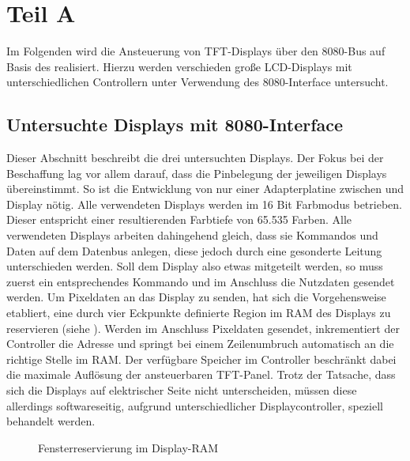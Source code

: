 \chapter{Teil A}
\label{cha:TeilA}
Im Folgenden wird die Ansteuerung von TFT-Displays über den 8080-Bus auf Basis des  realisiert. Hierzu werden verschieden große LCD-Displays mit unterschiedlichen Controllern unter Verwendung des 8080-Interface untersucht. 

\section{Untersuchte Displays mit 8080-Interface}
Dieser Abschnitt beschreibt die drei untersuchten Displays. Der Fokus bei der Beschaffung lag vor allem darauf, dass die Pinbelegung der jeweiligen Displays übereinstimmt. So ist die Entwicklung von nur einer Adapterplatine zwischen  und Display nötig. Alle verwendeten Displays werden im 16 Bit Farbmodus betrieben. Dieser entspricht einer resultierenden Farbtiefe von 65.535 Farben.\newline %
Alle verwendeten Displays arbeiten dahingehend gleich, dass sie Kommandos und Daten auf dem Datenbus anlegen, diese jedoch durch eine gesonderte Leitung unterschieden werden. Soll dem Display also etwas mitgeteilt werden, so muss zuerst ein entsprechendes Kommando und im Anschluss die Nutzdaten gesendet werden. Um Pixeldaten an das Display zu senden, hat sich die Vorgehensweise etabliert, eine durch vier Eckpunkte definierte Region im RAM des Displays zu reservieren (siehe ). Werden im Anschluss Pixeldaten gesendet, inkrementiert der Controller die Adresse und springt bei einem Zeilenumbruch automatisch an die richtige Stelle im RAM. Der verfügbare Speicher im Controller beschränkt dabei die maximale Auflösung der ansteuerbaren TFT-Panel. Trotz der Tatsache, dass sich die Displays auf elektrischer Seite nicht unterscheiden, müssen diese allerdings softwareseitig, aufgrund unterschiedlicher Displaycontroller, speziell behandelt werden.
\begin{figure}[h]
	\centering
{}
	\caption{Fensterreservierung im Display-RAM}
	\label{fig:ram_window}
\end{figure}
